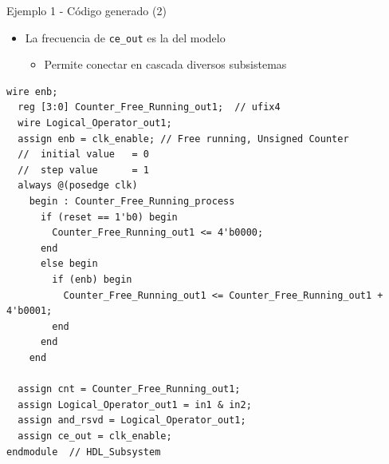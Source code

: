 \documentclass{beamer}
\begin{document}
\begin{frame}[fragile]{Ejemplo 1 - Código generado (2)}
\begin{itemize}
	\item La frecuencia de \texttt{ce\_out} es la del modelo 
	\begin{itemize}
		\item Permite conectar en cascada diversos subsistemas
	\end{itemize}
\end{itemize}
\begin{center}\begin{adjustbox}{padding=2pt 0pt 0pt 0pt, cfbox=blue!50 1pt}\begin{lstlisting}[basicstyle=\tiny]
  wire enb; 
  reg [3:0] Counter_Free_Running_out1;  // ufix4
  wire Logical_Operator_out1;
  assign enb = clk_enable; // Free running, Unsigned Counter
  //  initial value   = 0
  //  step value      = 1
  always @(posedge clk)
    begin : Counter_Free_Running_process
      if (reset == 1'b0) begin
        Counter_Free_Running_out1 <= 4'b0000;
      end
      else begin
        if (enb) begin
          Counter_Free_Running_out1 <= Counter_Free_Running_out1 + 4'b0001;
        end
      end
    end

  assign cnt = Counter_Free_Running_out1;
  assign Logical_Operator_out1 = in1 & in2;
  assign and_rsvd = Logical_Operator_out1;
  assign ce_out = clk_enable;
endmodule  // HDL_Subsystem
\end{lstlisting}\end{adjustbox}\end{center}
\end{frame}
\end{document}
